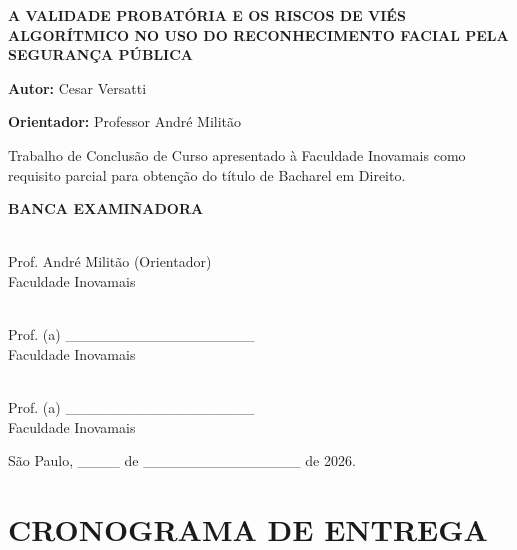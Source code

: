\documentclass[12pt,a4paper]{article}
\begin{document}
\newpage
\thispagestyle{empty}
\begin{center}
\vspace*{2cm}

{\large \textbf{A VALIDADE PROBATÓRIA E OS RISCOS DE VIÉS ALGORÍTMICO NO USO DO RECONHECIMENTO FACIAL PELA SEGURANÇA PÚBLICA}}

\vspace{2cm}

{\large \textbf{Autor:} Cesar Versatti}

{\large \textbf{Orientador:} Professor André Militão}

\vspace{3cm}

Trabalho de Conclusão de Curso apresentado à Faculdade Inovamais como requisito parcial para obtenção do título de Bacharel em Direito.

\vspace{3cm}

\textbf{BANCA EXAMINADORA}

\vspace{1cm}
\hrulefill \\
Prof. André Militão (Orientador) \\
Faculdade Inovamais

\vspace{0.5cm}
\hrulefill \\
Prof. (a) \_\_\_\_\_\_\_\_\_\_\_\_\_\_\_\_\_\_ \\
Faculdade Inovamais

\vspace{0.5cm}
\hrulefill \\
Prof. (a) \_\_\_\_\_\_\_\_\_\_\_\_\_\_\_\_\_\_ \\
Faculdade Inovamais

\vspace{3cm}
São Paulo, \_\_\_\_ de \_\_\_\_\_\_\_\_\_\_\_\_\_\_\_ de 2026.

\end{center}
\newpage

\section*{CRONOGRAMA DE ENTREGA}
\end{document}

